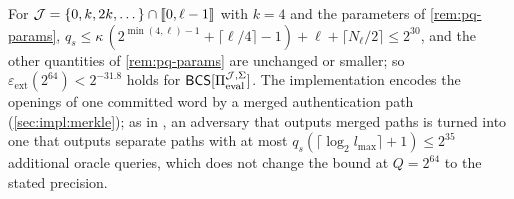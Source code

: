 \begin{remark}\label{rem:pq-skip}
For $\mathcal{J} = \{0, k, 2k, \dots\} \cap \llbracket 0, \ell-1 \rrbracket$ with $k = 4$ and the parameters of \cref{rem:pq-params}, $q_s \le \kappa\,(2^{\min(4,\ell)-1} + \lceil \ell/4 \rceil - 1) + \ell + \lceil N_\ell/2 \rceil \le 2^{30}$, and the other quantities of \cref{rem:pq-params} are unchanged or smaller; so $\varepsilon_{\mathrm{ext}}(2^{64}) < 2^{-31.8}$ holds for $\mathsf{BCS}[\Pi_{\mathrm{eval}}^{\mathcal{J},\Sigma}]$.
The implementation encodes the openings of one committed word by a merged authentication path (\cref{sec:impl:merkle}); as in , an adversary that outputs merged paths is turned into one that outputs separate paths with at most $q_s(\lceil\log_2 l_{\max}\rceil + 1) \le 2^{35}$ additional oracle queries, which does not change the bound at $Q = 2^{64}$ to the stated precision.
\end{remark}
